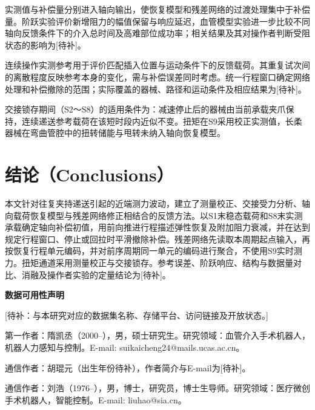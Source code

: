 \documentclass{JQR_LaTeX_Template-0507/JQRnew}
\providecommand{\RevisionColor}{\color{black}}
\newcommand{\revbegin}{\begingroup\RevisionColor}
\newcommand{\revend}{\par\endgroup}
\begin{document}
\revbegin
实测值与补偿量分别进入轴向输出，使恢复模型和残差网络的过渡处理集中于补偿量。阶跃实验评价新增阻力的幅值保留与响应延迟，血管模型实验进一步比较不同轴向反馈条件下的介入总时间及高难部位成功率；相关结果及其对操作者判断受阻状态的影响为[待补]。
\revend

连续操作实测参考用于评价匹配插入位置与运动条件下的反馈载荷。其重复试次间的离散程度反映参考本身的变化，需与补偿误差同时考虑。统一行程窗口确定网络处理和补偿撤除的范围；实际覆盖的器械、路径和运动条件及相应结果为[待补]。

\revbegin
交接锁存期间（S2～S8）的适用条件为：减速停止后的器械由当前承载夹爪保持，连续递送参考载荷在该短时段内近似不变。扭矩在S9采用校正实测值，长柔器械在弯曲管腔中的扭转储能与甩转未纳入轴向恢复模型。
\revend

\section{结论（Conclusions）}

本文针对往复夹持递送引起的近端测力波动，建立了测量校正、交接受力分析、轴向载荷恢复模型与残差网络修正相结合的反馈方法。以S1末稳态载荷和S8末实测承载确定轴向补偿初值，用前向推进行程描述弹性恢复及附加阻力衰减，并在达到规定行程窗口、停止或回拉时平滑撤除补偿。残差网络先读取本周期起点输入，再按恢复行程单元编码，并对前序周期同一单元的编码进行聚合，不使用S9实时测力。扭矩通道采用测量校正与交接锁存。参考误差、阶跃响应、结构与数据量对比、消融及操作者实验的定量结论为[待补]。

\noindent
\textbf{数据可用性声明}

\revbegin
[待补：与本研究对应的数据集名称、存储平台、访问链接及开放状态。]
\revend




\begin{AuthorIntroduction}
\Intro 第一作者：隋凯丞（2000--），男，硕士研究生。研究领域：血管介入手术机器人，机器人力感知与控制。E-mail: suikaicheng24@mails.ucas.ac.cn。
\revbegin

\Intro
通信作者：胡琨元（出生年份待补），作者简介与E-mail为[待补]。
\revend

\Intro 通信作者：刘浩（1976--），男，博士，研究员，博士生导师。研究领域：医疗微创手术机器人，智能控制。E-mail: liuhao@sia.cn。

\end{AuthorIntroduction}

\balance
\end{document}
